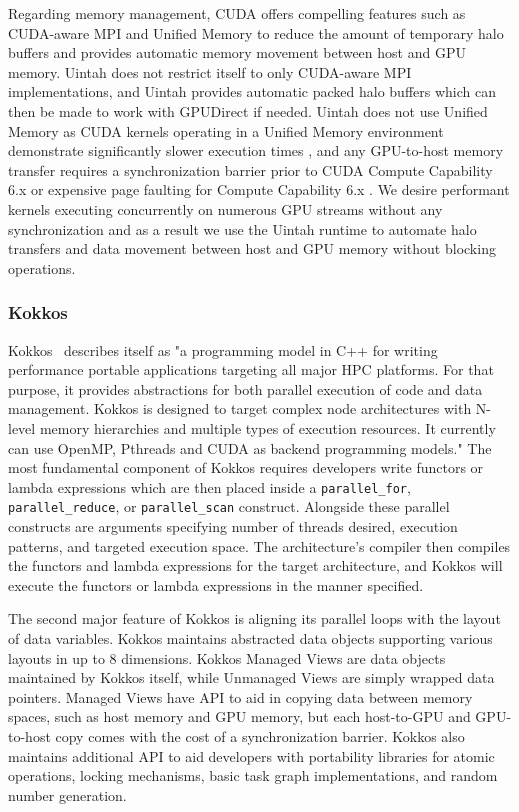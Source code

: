 \documentclass[12pt]{article}
\begin{document}
Regarding memory management, CUDA offers compelling features such as CUDA-aware MPI and Unified Memory to reduce the amount of temporary halo buffers and provides automatic memory movement between host and GPU memory.  Uintah does not restrict itself to only CUDA-aware MPI implementations, and Uintah provides automatic packed halo buffers which can then be made to work with GPUDirect if needed.  Uintah does not use Unified Memory as CUDA kernels operating in a Unified Memory environment demonstrate significantly slower execution times \cite{Landaverde2014AnIO}, and any GPU-to-host memory transfer requires a synchronization barrier prior to CUDA Compute Capability 6.x or expensive page faulting for Compute Capability 6.x \cite{nvidia-programming-guide-80}.  We desire performant kernels executing concurrently on numerous GPU streams without any synchronization and as a result we use the Uintah runtime to automate halo transfers and data movement between host and GPU memory without blocking operations.



\subsubsection{Kokkos}
\label{ch:Kokkos}
Kokkos~\cite{kokkos2012} describes itself as "a programming model in C++ for writing performance portable applications targeting all major HPC platforms. For that purpose, it provides abstractions for both parallel execution of code and data management. Kokkos is designed to target complex node architectures with N-level memory hierarchies and multiple types of execution resources. It currently can use OpenMP, Pthreads and CUDA as backend programming models."  The most fundamental component of Kokkos requires developers write functors or lambda expressions which are then placed inside a \texttt{parallel\_for}, \texttt{parallel\_reduce}, or \texttt{parallel\_scan} construct.  Alongside these parallel constructs are arguments specifying number of threads desired, execution patterns, and targeted execution space.  The architecture's compiler then compiles the functors and lambda expressions for the target architecture, and Kokkos will execute the functors or lambda expressions in the manner specified.  

The second major feature of Kokkos is aligning its parallel loops with the layout of data variables.  Kokkos maintains abstracted data objects supporting various layouts in up to 8 dimensions.   Kokkos Managed Views are data objects maintained by Kokkos itself, while Unmanaged Views are simply wrapped data pointers.  Managed Views have API to aid in copying data between memory spaces, such as host memory and GPU memory, but each host-to-GPU and GPU-to-host copy comes with the cost of a synchronization barrier.  Kokkos also maintains additional API to aid developers with portability libraries for atomic operations, locking mechanisms, basic task graph implementations, and random number generation.
\end{document}
